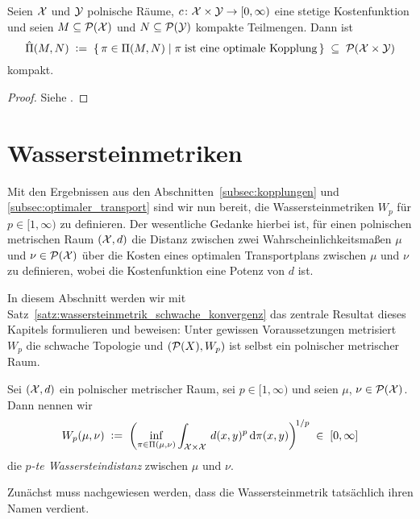\documentclass[../thesis/thesis.tex]{subfiles}
\begin{document}
	\begin{Satz}
		\label{satz:optimale_transportpläne_kompakt}
		Seien $\mathcal{X}$ und $\mathcal{Y}$ polnische Räume, $c \colon \mathcal{X} \times \mathcal{Y} \to [0, \infty)$ eine stetige Kostenfunktion und seien $M \subseteq \mathcal{P}(\mathcal{X})$ und $N \subseteq \mathcal{P}(\mathcal{Y})$ kompakte Teilmengen.
		Dann ist 
		\[ \hat{\Pi}(M, N) \; \vcentcolon = \; \left\{\, \pi \in \Pi(M, N) \; \middle| \; \pi \; \text{ist eine optimale Kopplung} \,\right\} \; \subseteq \; \mathcal{P}(\mathcal{X} \times \mathcal{Y}) \]
		kompakt.
	\end{Satz}

	\begin{proof}
		Siehe \cite[Corollary 5.21]{Villani.2009}.
	\end{proof}

	\section{Wassersteinmetriken}
	\label{subsec:wassersteinmetriken}
	
	Mit den Ergebnissen aus den Abschnitten~\ref{subsec:kopplungen} und \ref{subsec:optimaler_transport} sind wir nun bereit, die Wassersteinmetriken $W_p$ für $p \in [1, \infty)$ zu definieren. Der wesentliche Gedanke hierbei ist,
	für einen polnischen metrischen Raum $(\mathcal{X}, d)$ die Distanz zwischen zwei Wahrscheinlichkeitsmaßen $\mu$ und $\nu \in \mathcal{P}(\mathcal{X})$ über die Kosten eines optimalen Transportplans zwischen $\mu$ und
	$\nu$ zu definieren, wobei die Kostenfunktion eine Potenz von $d$ ist.
	
	In diesem Abschnitt werden wir mit Satz~\ref{satz:wassersteinmetrik_schwache_konvergenz} das zentrale Resultat dieses Kapitels formulieren und beweisen: Unter gewissen Voraussetzungen metrisiert $W_p$ die schwache Topologie und $(\mathcal{P}(X), W_p)$ ist selbst ein polnischer metrischer Raum.

	\begin{Definition}
		\label{def:wassersteinmetrik}
		Sei $(\mathcal{X}, d)$ ein polnischer metrischer Raum, sei $p \in [1, \infty)$ und seien $\mu$, $\nu \in \mathcal{P}(\mathcal{X})$. Dann nennen wir
		$$ W_p(\mu, \nu) \; \vcentcolon = \; \left(\inf_{\pi \in \Pi(\mu, \nu)} \int_{\mathcal{X} \times \mathcal{X}} \, d(x, y)^p \, \mathrm{d}\pi(x, y)\right)^{\! 1/p} \; \in \; [0, \infty] $$
		die \emph{$p$-te Wassersteindistanz} zwischen $\mu$ und $\nu$.
	\end{Definition}

	Zunächst muss nachgewiesen werden, dass die Wassersteinmetrik tatsächlich ihren Namen verdient.
\end{document}
